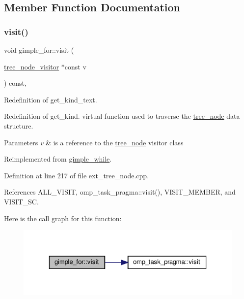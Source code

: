 \subsection{Member Function Documentation}
\mbox{\label{structgimple__for_a582c8e3f0d70da9d0c1e8365eb56836d}} 
\subsubsection{\texorpdfstring{visit()}{visit()}}
{\footnotesize\ttfamily void gimple\+\_\+for\+::visit (\begin{DoxyParamCaption}\item[{\hyperlink{classtree__node__visitor}{tree\+\_\+node\+\_\+visitor} $\ast$const}]{v }\end{DoxyParamCaption}) const\hspace{0.3cm}{\ttfamily [override]}, {\ttfamily [virtual]}}



Redefinition of get\+\_\+kind\+\_\+text. 

Redefinition of get\+\_\+kind. virtual function used to traverse the \hyperlink{classtree__node}{tree\+\_\+node} data structure. 
\begin{DoxyParams}{Parameters}
{\em v} & is a reference to the \hyperlink{classtree__node}{tree\+\_\+node} visitor class \\
\hline
\end{DoxyParams}


Reimplemented from \hyperlink{structgimple__while_a8fbe7b677d626e16026d600db417ef32}{gimple\+\_\+while}.



Definition at line 217 of file ext\+\_\+tree\+\_\+node.\+cpp.



References A\+L\+L\+\_\+\+V\+I\+S\+IT, omp\+\_\+task\+\_\+pragma\+::visit(), V\+I\+S\+I\+T\+\_\+\+M\+E\+M\+B\+ER, and V\+I\+S\+I\+T\+\_\+\+SC.

Here is the call graph for this function\+:
\nopagebreak
\begin{figure}[H]
\begin{center}
\leavevmode
\includegraphics[width=323pt]{da/d1d/structgimple__for_a582c8e3f0d70da9d0c1e8365eb56836d_cgraph}
\end{center}
\end{figure}


